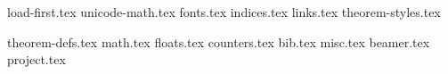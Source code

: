 
{load-first.tex}
{unicode-math.tex}
{fonts.tex}
{indices.tex}
{links.tex}
{theorem-styles.tex}
\theoremstyle{it}
{theorem-defs.tex}
{math.tex}
{floats.tex}
{counters.tex}
{bib.tex}
{misc.tex}
{beamer.tex}
{project.tex}
